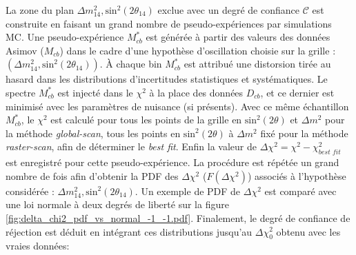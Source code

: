 
La zone du plan $\Delta m^2_{14}, \textrm{sin}^2(2\theta_{14})$ exclue avec un degré de confiance $\mathcal{C}$ est construite en faisant un grand nombre de \og pseudo-expériences \fg{} par simulations MC. Une pseudo-expérience $M_{cb}^*$ est générée à partir des valeurs des données Asimov ($M_{cb}$) dans le cadre d'une hypothèse d'oscillation choisie sur la grille : $\left(\Delta m^2_{14}, \textrm{sin}^2(2\theta_{14})\right)$. À chaque bin $M^*_{cb}$ est attribué une distorsion tirée au hasard dans les distributions d'incertitudes statistiques et systématiques. Le spectre $M^*_{cb}$ est injecté dans le $\chi^2$ à la place des données $D_{cb}$, et ce dernier est minimisé avec les paramètres de nuisance (si présents). Avec ce même échantillon $M^*_{cb}$, le $\chi^2$ est calculé pour tous les points de la grille en $\textrm{sin}^2(2\theta)$ et $\Delta m^2$ pour la méthode \textit{global-scan}, tous les points en $\textrm{sin}^2(2\theta)$ à $\Delta m^2$ fixé pour la méthode \textit{raster-scan}, afin de déterminer le \textit{best fit}. Enfin la valeur de $\Delta\chi^2 = \chi^2 - \chi^2_\textit{best fit}$ est enregistré pour cette pseudo-expérience. La procédure est répétée un grand nombre de fois afin d'obtenir la PDF des $\Delta\chi^2$ ($F(\Delta\chi^2)$) associés à l'hypothèse considérée : $\Delta m^2_{14}, \textrm{sin}^2(2\theta_{14})$. Un exemple de PDF de $\Delta\chi^2$ est comparé avec une loi normale à deux degrés de liberté sur la figure \ref{fig:delta_chi2_pdf_vs_normal_-1_-1.pdf}. Finalement, le degré de confiance de réjection est déduit en intégrant ces distributions jusqu'au $\Delta\chi^2_0$ obtenu avec les vraies données:

